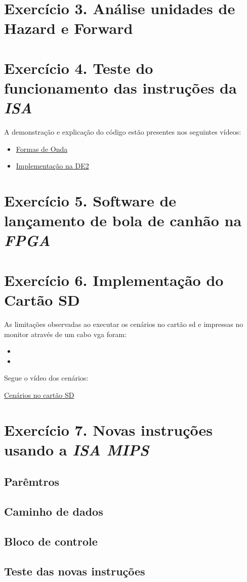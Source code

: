 \documentclass[12pt]{article}
\begin{document}
\section{Exercício 3. Análise unidades de Hazard e Forward}
\label{sec:hazardforward}

\section{Exercício 4. Teste do funcionamento das instruções da \textit{ISA} }
\label{sec:testeisa}

A demonstração e explicação do código estão presentes nos seguintes vídeos:

\begin{itemize}
\item \href{https://youtu.be/u5eFv9_BDSw}{Formas de Onda}
\item \href{https://youtu.be/PA9af2_Dhi4}{Implementação na DE2} 
\end{itemize}


\section{Exercício 5. Software de lançamento de bola de canhão na \textit{FPGA}}
\label{sec:canhao}


\section{Exercício 6. Implementação do Cartão SD}
\label{sec:cartaosd}

As limitações observadas ao executar os cenários no cartão sd e impressas no monitor através de um cabo vga foram:

\begin{itemize}
\item 
\item 
\end{itemize} 

Segue o vídeo dos cenários:

\href{https://youtu.be/VeoxltP3L6o}{Cenários no cartão SD}

  
\section{Exercício 7. Novas instruções usando a \textit{ISA MIPS}}
\label{sec:isamips} 

\subsection{Parêmtros}
\label{subsec:param}


\subsection{Caminho de dados}
\label{subsec:datapath}


\subsection{Bloco de controle}
\label{subsec:control}


\subsection{Teste das novas instruções}
\label{subsec:testeisa}




\end{document}
